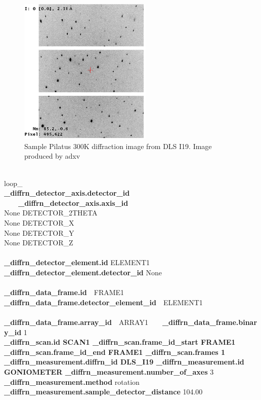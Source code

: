 \documentclass[11pt]{a0poster}
\begin{document}
\begin{minipage}[]{0.29\linewidth}
\begin{figure}
\begin{center}
\includegraphics[width=2.5in]{1191_00005}
\caption{\fontsize{15}{21}\selectfont %
Sample Pilatus 300K diffraction image from DLS I19.
Image produced by adxv
}
\label{fig:1191_00005}
\end{center}
\end{figure}
\\
loop\_\\
{\bf \_diffrn\_detector\_axis.detector\_id}\\
\-\ ~~~{\bf \_diffrn\_detector\_axis.axis\_id}\\
 None DETECTOR\_2THETA\\
 None DETECTOR\_X\\
 None DETECTOR\_Y\\
 None DETECTOR\_Z\\
\\
{\bf \_diffrn\_detector\_element.id} ELEMENT1  
{\bf \_diffrn\_detector\_element.detector\_id}  None \-\\ \\
{\bf \_diffrn\_data\_frame.id}~~FRAME1\\
{\bf \_diffrn\_data\_frame.detector\_element\_id}~~ELEMENT1 \-\\ \\
{\bf \_diffrn\_data\_frame.array\_id}~~ARRAY1~~~~{\bf \_diffrn\_data\_frame.binary\_id} 1\\
{\bf \_diffrn\_scan.id SCAN1  {\bf \_diffrn\_scan.frame\_id\_start} FRAME1\\
{\bf \_diffrn\_scan.frame\_id\_end} FRAME1  {\bf \_diffrn\_scan.frames} 1\\
{\bf \_diffrn\_measurement.diffrn\_id} DLS\_I19  {\bf \_diffrn\_measurement.id} GONIOMETER  \_diffrn\_measurement.number\_of\_axes} 3  {\bf \_diffrn\_measurement.method} rotation\\
{\bf \_diffrn\_measurement.sample\_detector\_distance} 104.00\\

\end{minipage}
\end{document}
